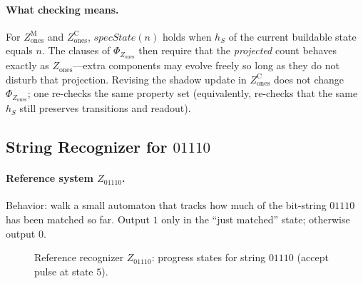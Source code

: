 \paragraph{What checking means.}
For $Z_{\mathrm{ones}}^{\mathrm{M}}$ and $Z_{\mathrm{ones}}^{\mathrm{C}}$, $\mathit{specState}(n)$ holds when $h_S$ of the current buildable state equals $n$. The clauses of $\Phi_{Z_{\mathrm{ones}}}$ then require that the \emph{projected} count behaves exactly as $Z_{\mathrm{ones}}$---extra components may evolve freely so long as they do not disturb that projection. Revising the shadow update in $Z_{\mathrm{ones}}^{\mathrm{C}}$ does not change $\Phi_{Z_{\mathrm{ones}}}$; one re-checks the same property set (equivalently, re-checks that the same $h_S$ still preserves transitions and readout).

\subsection{String Recognizer for \texorpdfstring{$01110$}{01110}}
\label{sec:case-pattern}

\paragraph{Reference system $Z_{01110}$.}
Behavior: walk a small automaton that tracks how much of the bit-string $01110$ has been matched so far. Output $1$ only in the ``just matched'' state; otherwise output $0$.

\begin{figure}[t]
\centering
{}
\caption{Reference recognizer $Z_{01110}$: progress states for string $01110$ (accept pulse at state $5$).}
\label{fig:z-pattern}
\end{figure}

